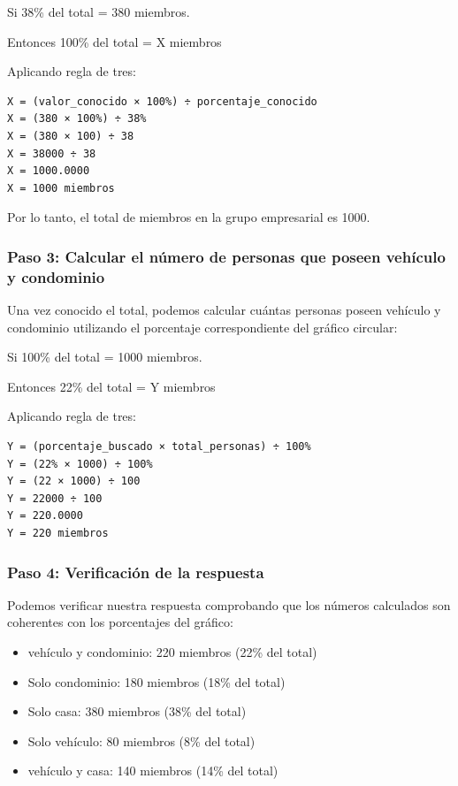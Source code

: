 \documentclass[
]{article}
\providecommand{\tightlist}{%
  \setlength{\itemsep}{0pt}\setlength{\parskip}{0pt}}
\begin{document}
Si 38\% del total = 380 miembros.

Entonces 100\% del total = X miembros

Aplicando regla de tres:

\begin{verbatim}
X = (valor_conocido × 100%) ÷ porcentaje_conocido
X = (380 × 100%) ÷ 38%
X = (380 × 100) ÷ 38
X = 38000 ÷ 38
X = 1000.0000
X = 1000 miembros
\end{verbatim}

Por lo tanto, el total de miembros en la grupo empresarial es 1000.

\subsubsection{Paso 3: Calcular el número de personas que poseen
vehículo y
condominio}\label{paso-3-calcular-el-nuxfamero-de-personas-que-poseen-vehuxedculo-y-condominio}

Una vez conocido el total, podemos calcular cuántas personas poseen
vehículo y condominio utilizando el porcentaje correspondiente del
gráfico circular:

Si 100\% del total = 1000 miembros.

Entonces 22\% del total = Y miembros

Aplicando regla de tres:

\begin{verbatim}
Y = (porcentaje_buscado × total_personas) ÷ 100%
Y = (22% × 1000) ÷ 100%
Y = (22 × 1000) ÷ 100
Y = 22000 ÷ 100
Y = 220.0000
Y = 220 miembros
\end{verbatim}

\subsubsection{Paso 4: Verificación de la
respuesta}\label{paso-4-verificaciuxf3n-de-la-respuesta}

Podemos verificar nuestra respuesta comprobando que los números
calculados son coherentes con los porcentajes del gráfico:

\begin{itemize}
\tightlist
\item
  vehículo y condominio: 220 miembros (22\% del total)
\item
  Solo condominio: 180 miembros (18\% del total)
\item
  Solo casa: 380 miembros (38\% del total)
\item
  Solo vehículo: 80 miembros (8\% del total)
\item
  vehículo y casa: 140 miembros (14\% del total)
\end{itemize}
\end{document}
